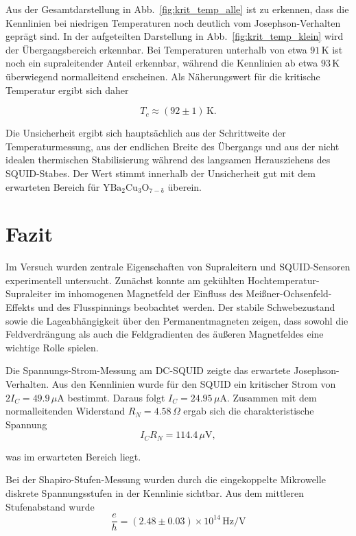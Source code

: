 \documentclass{article}
\begin{document}
Aus der Gesamtdarstellung in Abb.~\ref{fig:krit_temp_alle} ist zu erkennen, dass die Kennlinien bei niedrigen Temperaturen noch deutlich vom Josephson-Verhalten geprägt sind. In der aufgeteilten Darstellung in Abb.~\ref{fig:krit_temp_klein} wird der Übergangsbereich erkennbar. Bei Temperaturen unterhalb von etwa $91\,\mathrm{K}$ ist noch ein supraleitender Anteil erkennbar, während die Kennlinien ab etwa $93\,\mathrm{K}$ überwiegend normalleitend erscheinen. Als Näherungswert für die kritische Temperatur ergibt sich daher

\begin{equation}
    T_c \approx (92 \pm 1)\,\mathrm{K}.
\end{equation}

Die Unsicherheit ergibt sich hauptsächlich aus der Schrittweite der Temperaturmessung, aus der endlichen Breite des Übergangs und aus der nicht idealen thermischen Stabilisierung während des langsamen Herausziehens des SQUID-Stabes. Der Wert stimmt innerhalb der Unsicherheit gut mit dem erwarteten Bereich für $\mathrm{YBa_2Cu_3O_{7-\delta}}$ überein.


\section{Fazit}

Im Versuch wurden zentrale Eigenschaften von Supraleitern und SQUID-Sensoren experimentell untersucht. Zunächst konnte am gekühlten Hochtemperatur-Supraleiter im inhomogenen Magnetfeld der Einfluss des Meißner-Ochsenfeld-Effekts und des Flusspinnings beobachtet werden. Der stabile Schwebezustand sowie die Lageabhängigkeit über den Permanentmagneten zeigen, dass sowohl die Feldverdrängung als auch die Feldgradienten des äußeren Magnetfeldes eine wichtige Rolle spielen.

Die Spannungs-Strom-Messung am DC-SQUID zeigte das erwartete Josephson-Verhalten. Aus den Kennlinien wurde für den SQUID ein kritischer Strom von $2I_C=49.9\,\mu\mathrm{A}$ bestimmt. Daraus folgt $I_C=24.95\,\mu\mathrm{A}$. Zusammen mit dem normalleitenden Widerstand $R_N=4.58\,\Omega$ ergab sich die charakteristische Spannung
\begin{equation}
    I_C R_N = 114.4\,\mu\mathrm{V},
\end{equation}

was im erwarteten Bereich liegt.

Bei der Shapiro-Stufen-Messung wurden durch die eingekoppelte Mikrowelle diskrete Spannungsstufen in der Kennlinie sichtbar. Aus dem mittleren Stufenabstand wurde
\begin{equation}
    \frac{e}{h}=(2.48\pm0.03)\times10^{14}\,\mathrm{Hz/V}
\end{equation}
\end{document}
